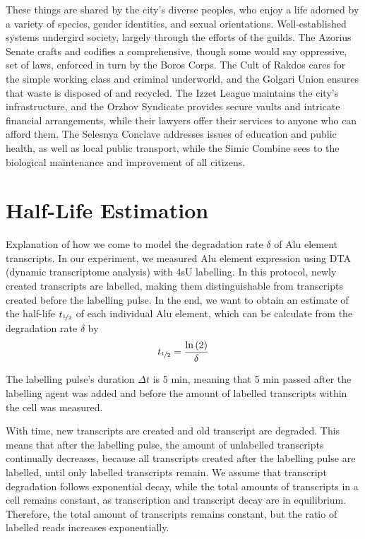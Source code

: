 These things are shared by the city's diverse peoples, who enjoy a life adorned
by a variety of  species, gender identities, and sexual orientations.
Well-established systems undergird society, largely through the efforts of the
guilds. The Azorius Senate crafts and codifies a comprehensive, though some
would say oppressive, set of laws, enforced in turn by the Boros Corps. The Cult
of Rakdos cares for the simple working class and criminal underworld, and the
Golgari Union ensures that waste is disposed of and recycled. The Izzet League
maintains the city's infrastructure, and the Orzhov Syndicate provides secure
vaults and intricate financial arrangements, while their lawyers offer their
services to anyone who can afford them. The Selesnya Conclave addresses issues
of education and public health, as well as local public transport, while the
Simic Combine sees to the biological maintenance and improvement of all
citizens.

\section*{Half-Life Estimation}

Explanation of how we come to model the degradation rate
$\delta$ of Alu
element transcripts. In our experiment, we measured Alu element expression using
DTA (dynamic transcriptome analysis) with 4sU labelling. In this protocol, newly
created transcripts are labelled, making them distinguishable from transcripts
created before the labelling pulse. In the end, we want to obtain an estimate of
the half-life $t_{\nicefrac{1}{2}}$ of each individual Alu element, which can be
calculate from the degradation rate
$\delta$ by
\begin{equation*}
t_{\nicefrac{1}{2}}=\frac{\ln\left(2\right)}{\delta}
\end{equation*}

\noindent The labelling pulse's duration $\Delta t$ is 5 min, meaning that 5 min
passed after the labelling agent was added and before the amount of labelled
transcripts within the cell was measured.

With time, new transcripts are created and old transcript are degraded. This
means that after the labelling pulse, the amount of unlabelled transcripts
continually decreases, because all transcripts created after the labelling pulse
are labelled, until only labelled transcripts remain. We assume that transcript
degradation follows exponential decay, while the total amounts of transcripts
in a cell remains constant, as transcription and transcript decay are in
equilibrium. Therefore, the total amount of transcripts remains constant, but
the ratio of labelled reads increases exponentially.

